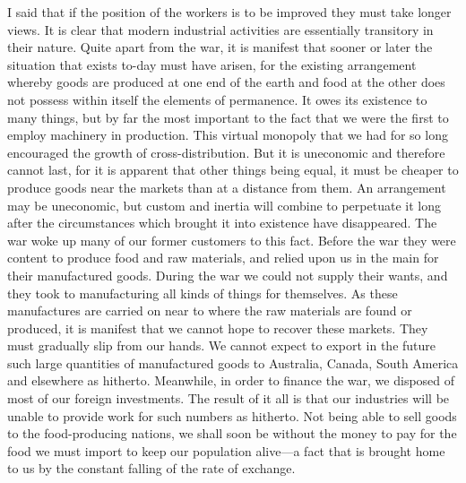 \documentclass{book}
\begin{document}
I said that if the position of the workers is to be improved they must take longer views. It is clear that modern industrial activities are essentially transitory in their nature. Quite apart from the war, it is manifest that sooner or later the situation that exists to-day must have arisen, for the existing arrangement whereby goods are produced at one end of the earth and food at the other does not possess within itself the elements of permanence. It owes its existence to many things, but by far the most important to the fact that we were the first to employ machinery in production. This virtual monopoly that we had for so long encouraged the growth of cross-distribution. But it is uneconomic and therefore cannot last, for it is apparent that other things being equal, it must be cheaper to produce goods near the markets than at a distance from them. An arrangement may be uneconomic, but custom and inertia will combine to perpetuate it long after the circumstances which brought it into existence have disappeared. The war woke up many of our former customers to this fact. Before the war they were content to produce food and raw materials, and relied upon us in the main for their manufactured goods. During the war we could not supply their wants, and they took to manufacturing all kinds of things for themselves. As these manufactures are carried on near to where the raw materials are found or produced, it is manifest that we cannot hope to recover these markets. They must gradually slip from our hands. We cannot expect to export in the future such large quantities of manufactured goods to Australia, Canada, South America and elsewhere as hitherto. Meanwhile, in order to finance the war, we disposed of most of our foreign investments. The result of it all is that our industries will be unable to provide work for such numbers as hitherto. Not being able to sell goods to the food-producing nations, we shall soon be without the money to pay for the food we must import to keep our population alive—a fact that is brought home to us by the constant falling of the rate of exchange.
\end{document}
